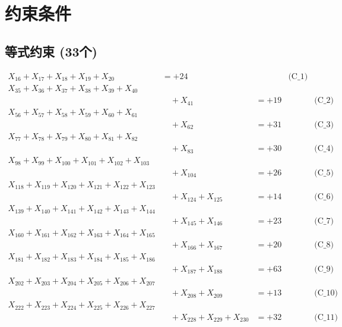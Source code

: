 \documentclass[a4paper,10pt]{article}
\begin{document}
\section{约束条件}

\subsection{等式约束 (33个)}

\allowdisplaybreaks
{\small
\begin{align}
X_{16} + X_{17} + X_{18} + X_{19} + X_{20} &= +24 && \text{(C\_1)} \\
X_{35} + X_{36} + X_{37} + X_{38} + X_{39} + X_{40} \\[0.1ex]
&\quad  + X_{41} &= +19 && \text{(C\_2)} \\
X_{56} + X_{57} + X_{58} + X_{59} + X_{60} + X_{61} \\[0.1ex]
&\quad  + X_{62} &= +31 && \text{(C\_3)} \\
X_{77} + X_{78} + X_{79} + X_{80} + X_{81} + X_{82} \\[0.1ex]
&\quad  + X_{83} &= +30 && \text{(C\_4)} \\
X_{98} + X_{99} + X_{100} + X_{101} + X_{102} + X_{103} \\[0.1ex]
&\quad  + X_{104} &= +26 && \text{(C\_5)} \\
\allowbreak
X_{118} + X_{119} + X_{120} + X_{121} + X_{122} + X_{123} \\[0.1ex]
&\quad  + X_{124} + X_{125} &= +14 && \text{(C\_6)} \\
X_{139} + X_{140} + X_{141} + X_{142} + X_{143} + X_{144} \\[0.1ex]
&\quad  + X_{145} + X_{146} &= +23 && \text{(C\_7)} \\
X_{160} + X_{161} + X_{162} + X_{163} + X_{164} + X_{165} \\[0.1ex]
&\quad  + X_{166} + X_{167} &= +20 && \text{(C\_8)} \\
X_{181} + X_{182} + X_{183} + X_{184} + X_{185} + X_{186} \\[0.1ex]
&\quad  + X_{187} + X_{188} &= +63 && \text{(C\_9)} \\
X_{202} + X_{203} + X_{204} + X_{205} + X_{206} + X_{207} \\[0.1ex]
&\quad  + X_{208} + X_{209} &= +13 && \text{(C\_10)} \\
\allowbreak
X_{222} + X_{223} + X_{224} + X_{225} + X_{226} + X_{227} \\[0.1ex]
&\quad  + X_{228} + X_{229} + X_{230} &= +32 && \text{(C\_11)} \\

\end{align}}
\end{document}
